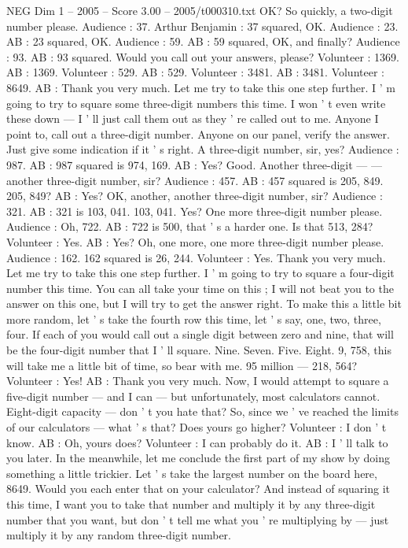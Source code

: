 \begin{textsample}{NEG Dim 1 – 2005 – Score 3.00 – 2005/t000310.txt}
OK?
So quickly, a two-digit number please.
Audience : 37.
Arthur Benjamin : 37 squared, OK.
Audience : 23.
AB : 23 squared, OK.
Audience : 59.
AB : 59 squared, OK, and finally?
Audience : 93.
AB : 93 squared.
Would you call out your answers, please?
Volunteer : 1369.
AB : 1369.
Volunteer : 529.
AB : 529.
Volunteer : 3481.
AB : 3481.
Volunteer : 8649.
AB : Thank you very much.
Let me try to take this one step further.
I ' m going to try to square some three-digit numbers this time.
I won ' t even write these down — I ' ll just call them out as they ' re called out to me.
Anyone I point to, call out a three-digit number.
Anyone on our panel, verify the answer.
Just give some indication if it ' s right.
A three-digit number, sir, yes?
Audience : 987.
AB : 987 squared is 974, 169.
AB : Yes?
Good.
Another three-digit — — another three-digit number, sir?
Audience : 457.
AB : 457 squared is 205, 849. 205, 849?
AB : Yes?
OK, another, another three-digit number, sir?
Audience : 321.
AB : 321 is 103, 041. 103, 041.
Yes?
One more three-digit number please.
Audience : Oh, 722.
AB : 722 is 500, that ' s a harder one.
Is that 513, 284?
Volunteer : Yes.
AB : Yes?
Oh, one more, one more three-digit number please.
Audience : 162. 162 squared is 26, 244.
Volunteer : Yes.
Thank you very much.
Let me try to take this one step further.
I ' m going to try to square a four-digit number this time.
You can all take your time on this ; I will not beat you to the answer on this one, but I will try to get the answer right.
To make this a little bit more random, let ' s take the fourth row this time, let ' s say, one, two, three, four.
If each of you would call out a single digit between zero and nine, that will be the four-digit number that I ' ll square.
Nine.
Seven.
Five.
Eight. 9, 758, this will take me a little bit of time, so bear with me. 95 million — 218, 564?
Volunteer : Yes!
AB : Thank you very much.
Now, I would attempt to square a five-digit number — and I can — but unfortunately, most calculators cannot.
Eight-digit capacity — don ' t you hate that?
So, since we ' ve reached the limits of our calculators — what ' s that?
Does yours go higher?
Volunteer : I don ' t know.
AB : Oh, yours does?
Volunteer : I can probably do it.
AB : I ' ll talk to you later.
In the meanwhile, let me conclude the first part of my show by doing something a little trickier.
Let ' s take the largest number on the board here, 8649.
Would you each enter that on your calculator?
And instead of squaring it this time, I want you to take that number and multiply it by any three-digit number that you want, but don ' t tell me what you ' re multiplying by — just multiply it by any random three-digit number.

\end{textsample}
